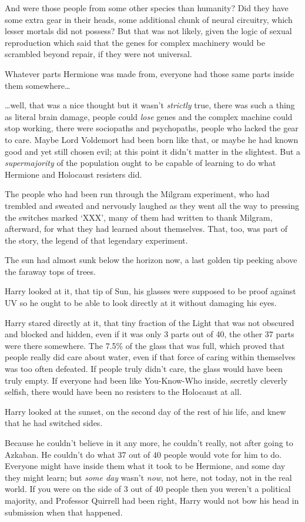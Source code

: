 And were those people from some other species than humanity? Did they have some extra gear in their heads, some additional chunk of neural circuitry, which lesser mortals did not possess? But that was not likely, given the logic of sexual reproduction which said that the genes for complex machinery would be scrambled beyond repair, if they were not universal.

Whatever parts Hermione was made from, everyone had those same parts inside them somewhere…

…well, that was a nice thought but it wasn’t \emph{strictly} true, there was such a thing as literal brain damage, people could \emph{lose} genes and the complex machine could stop working, there were sociopaths and psychopaths, people who lacked the gear to care. Maybe Lord Voldemort had been born like that, or maybe he had known good and yet still chosen evil; at this point it didn’t matter in the slightest. But a \emph{supermajority} of the population ought to be capable of learning to do what Hermione and Holocaust resisters did.

The people who had been run through the Milgram experiment, who had trembled and sweated and nervously laughed as they went all the way to pressing the switches marked ‘XXX’, many of them had written to thank Milgram, afterward, for what they had learned about themselves. That, too, was part of the story, the legend of that legendary experiment.

The sun had almost sunk below the horizon now, a last golden tip peeking above the faraway tops of trees.

Harry looked at it, that tip of Sun, his glasses were supposed to be proof against UV so he ought to be able to look directly at it without damaging his eyes.

Harry stared directly at it, that tiny fraction of the Light that was not obscured and blocked and hidden, even if it was only 3 parts out of 40, the other 37 parts were there somewhere. The 7.5\% of the glass that was full, which proved that people really did care about water, even if that force of caring within themselves was too often defeated. If people truly didn’t care, the glass would have been truly empty. If everyone had been like You-Know-Who inside, secretly cleverly selfish, there would have been no resisters to the Holocaust at all.

Harry looked at the sunset, on the second day of the rest of his life, and knew that he had switched sides.

Because he couldn’t believe in it any more, he couldn’t really, not after going to Azkaban. He couldn’t do what 37 out of 40 people would vote for him to do. Everyone might have inside them what it took to be Hermione, and some day they might learn; but \emph{some day} wasn’t \emph{now}, not here, not today, not in the real world. If you were on the side of 3 out of 40 people then you weren’t a political majority, and Professor Quirrell had been right, Harry would not bow his head in submission when that happened.

